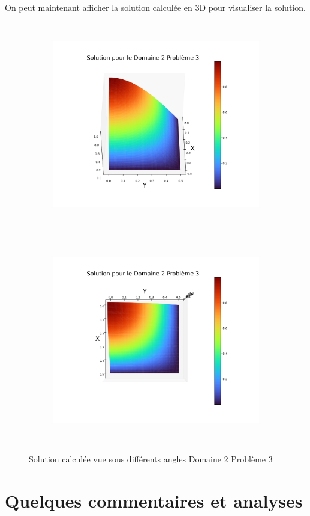 \documentclass[a4paper, 12pt, french]{report}
\begin{document}
On peut maintenant afficher la solution calculée en 3D pour visualiser la solution.
\begin{figure}[!h]
    \centering
    \begin{subfigure}{0.48\textwidth}
    	\centering
        \includegraphics[height=9cm]{../Images/Figures_Calculees/sol3D23.png}
    \end{subfigure}
    \begin{subfigure}{0.48\textwidth}
    \centering
        \includegraphics[height=9cm]{../Images/Figures_Calculees/sol3DVH23.png}
    \end{subfigure}
    \caption{Solution calculée vue sous différents angles Domaine 2 Problème 3 }
\end{figure}
\newpage 

\section{Quelques commentaires et analyses}
\end{document}
